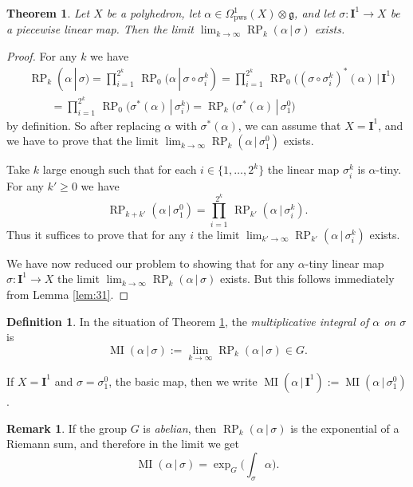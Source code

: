 \documentclass[10pt, a4paper]{amsart}
\newtheorem{thm}[equation]{Theorem}
\theoremstyle{definition}
\newtheorem{dfn}[equation]{Definition}
\newtheorem{rem}[equation]{Remark}
\numberwithin{equation}{section}
\newcommand{\opn}{\operatorname}
\newcommand{\mfrak}[1]{\mathfrak{#1}}
\newcommand{\mbf}[1]{\mathbf{#1}}
\newcommand{\mrm}[1]{\mathrm{#1}}
\renewcommand{\vert}{\, | \,}
\newcommand{\g}{\mfrak{g}}
\begin{document}
\begin{thm} \label{thm:13}
Let $X$ be a polyhedron, let 
$\alpha \in \Omega^1_{\mrm{pws}}(X) \otimes \g$,
and let $\sigma : \mbf{I}^{1} \to X$ be a piecewise linear map. Then the limit
$\lim_{k \to \infty} \opn{RP}_{k}(\alpha \vert \sigma)$
exists.
\end{thm}

\begin{proof}
For any $k$ we have
\[ \begin{aligned}
& \opn{RP}_{k}(\alpha \vert \sigma) = 
\prod_{i = 1}^{2^k} \, \opn{RP}_{0}(\alpha \vert \sigma \circ \sigma^k_i) =
\prod_{i = 1}^{2^k} \, \opn{RP}_{0} \bigl( (\sigma \circ \sigma^k_i)^*(\alpha)
\vert \mbf{I}^1 \bigr) \\
& \qquad = 
\prod_{i = 1}^{2^k} \, \opn{RP}_{0} \bigl( \sigma^*(\alpha)
\vert \sigma^k_i \bigr) = 
\opn{RP}_{k} \bigl( \sigma^*(\alpha) \vert \sigma^0_1 \bigr) 
\end{aligned} \]
by definition. 
So after replacing $\alpha$ with $\sigma^*(\alpha)$, we can assume that 
$X = \mbf{I}^1$, and we have to prove that the limit 
$\lim_{k \to \infty} \opn{RP}_{k}(\alpha \vert \sigma^0_1)$ exists. 

Take $k$ large enough such that for each $i \in \{ 1, \ldots, 2^k \}$
the linear map $\sigma^k_i$ is $\alpha$-tiny. 
For any $k' \geq 0$ we have
\[ \opn{RP}_{k + k'}(\alpha \vert \sigma^0_1) = 
\prod_{i = 1}^{2^k}  \, \opn{RP}_{k'}(\alpha \vert \sigma^k_i) . \]
Thus it suffices to prove that for any $i$ the limit
$\lim_{k' \to \infty} \opn{RP}_{k'}(\alpha \vert \sigma^k_i)$
exists.

We have now reduced our problem to showing that for any $\alpha$-tiny
linear map $\sigma : \mbf{I}^1 \to X$ the limit
$\lim_{k \to \infty} \opn{RP}_{k}(\alpha \vert \sigma)$
exists. But this follows immediately from Lemma \ref{lem:31}.
\end{proof}

\begin{dfn} \label{dfn:28}
In the situation of Theorem \ref{thm:13}, the 
{\em multiplicative integral of $\alpha$ on $\sigma$} is 
\[ \opn{MI}(\alpha \vert \sigma) := 
\lim_{k \to \infty} \opn{RP}_{k}(\alpha \vert \sigma) \in G . \] 

If $X = \mbf{I}^{1}$ and $\sigma = \sigma^0_1$, the basic map, then we write
$\opn{MI}(\alpha \vert \mbf{I}^{1}) := \opn{MI}(\alpha \vert \sigma^0_1)$.
\end{dfn}

\begin{rem}
If the group $G$ is {\em abelian}, then 
$\opn{RP}_k(\alpha \vert \sigma)$
is the exponential of a Riemann sum, and therefore in the limit we get
\[ \opn{MI}(\alpha \vert \sigma) = 
\exp_G \bigl( \int_{\sigma} \alpha \bigr) . \]
\end{rem}
\end{document}
